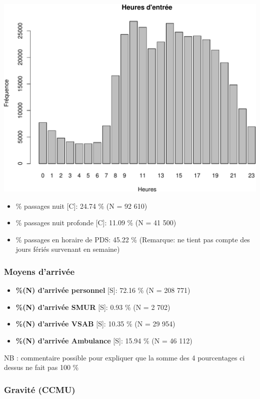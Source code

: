 \documentclass[]{article}
\begin{document}
\includegraphics{rapport2014_V4_files/figure-latex/horaires-1.pdf}

\begin{itemize}
\item
  \% passages nuit {[}C{]}: 24.74 \% (N = 92 610)
\item
  \% passages nuit profonde {[}C{]}: 11.09 \% (N = 41 500)
\item
  \% passages en horaire de PDS: 45.22 \% (Remarque: ne tient pas compte
  des jours fériés survenant en semaine)
\end{itemize}

\subsubsection{Moyens d'arrivée}\label{moyens-darrivee}

\begin{itemize}
\itemsep1pt\parskip0pt
\item
  \textbf{\%(N) d'arrivée personnel} {[}S{]}: 72.16 \% (N = 208 771)
\item
  \textbf{\%(N) d'arrivée SMUR} {[}S{]}: 0.93 \% (N = 2 702)
\item
  \textbf{\%(N) d'arrivée VSAB} {[}S{]}: 10.35 \% (N = 29 954)
\item
  \textbf{\%(N) d'arrivée Ambulance} {[}S{]}: 15.94 \% (N = 46 112)
\end{itemize}

NB : commentaire possible pour expliquer que la somme des 4 pourcentages
ci dessus ne fait pas 100 \%

\subsubsection{Gravité (CCMU)}\label{gravite-ccmu}
\end{document}

